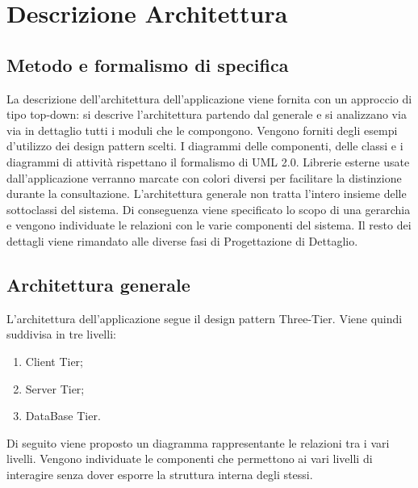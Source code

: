 %


\section{Descrizione Architettura} %
\label{sec:descrizione_architettura}

\subsection{Metodo e formalismo di specifica}
La descrizione dell'architettura dell'applicazione viene fornita con un approccio di tipo top-down: si descrive l'architettura partendo dal generale e si analizzano via via in dettaglio tutti i moduli che le compongono. Vengono forniti degli esempi d'utilizzo dei design pattern scelti. I diagrammi delle componenti, delle classi e i diagrammi di attività rispettano il formalismo di UML 2.0. \newline
Librerie esterne usate dall'applicazione verranno marcate con colori diversi per facilitare la distinzione durante la consultazione. \newline
L’architettura generale non tratta l’intero insieme delle sottoclassi del sistema. Di conseguenza viene specificato lo scopo di una gerarchia e vengono individuate le relazioni con le varie componenti del sistema. Il resto dei dettagli viene rimandato alle diverse fasi di Progettazione di Dettaglio.


	\subsection{Architettura generale}
	L’architettura dell'applicazione segue il design pattern Three-Tier. Viene quindi suddivisa in tre livelli:
		\begin{enumerate}
			\item Client Tier;
			\item Server Tier;
			\item DataBase Tier.
		\end{enumerate}
		\noindent
		Di seguito viene proposto un diagramma rappresentante le relazioni tra i vari livelli. Vengono individuate le componenti che permettono ai vari livelli di interagire senza dover esporre la struttura interna degli stessi. \newline \newline

